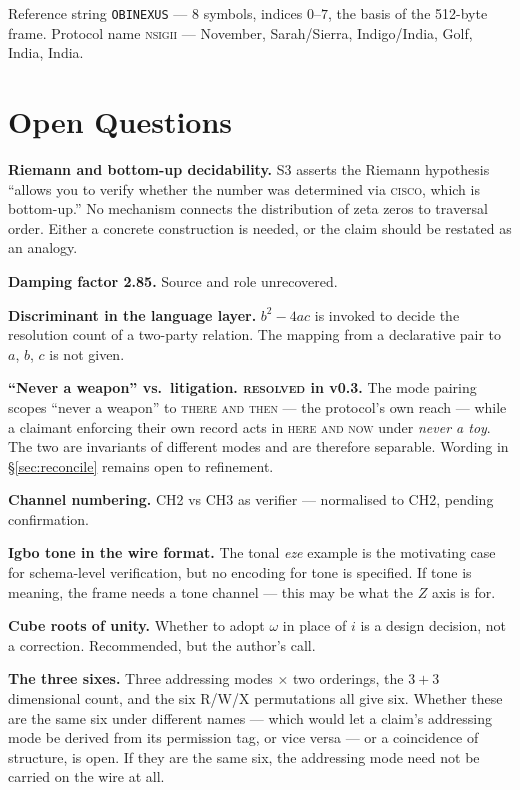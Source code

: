 \documentclass[11pt,a4paper]{article}
\newcommand{\NSIGII}{\textsc{nsigii}}
\newcommand{\CISCO}{\textsc{cisco}}
\newcommand{\OBI}{\texttt{OBINEXUS}}
\begin{document}
Reference string \OBI{} --- 8 symbols, indices $0$--$7$, the basis of the
512-byte frame. Protocol name \NSIGII{} --- November, Sarah/Sierra,
Indigo/India, Golf, India, India.

\section{Open Questions}
\label{app:open}

\begin{description}[leftmargin=1.6cm,style=nextline]
\item[C.1] \textbf{Riemann and bottom-up decidability.} S3 asserts the Riemann
  hypothesis ``allows you to verify whether the number was determined via
  \CISCO{}, which is bottom-up.'' No mechanism connects the distribution of zeta
  zeros to traversal order. Either a concrete construction is needed, or the
  claim should be restated as an analogy.
\item[C.2] \textbf{Damping factor 2.85.} Source and role unrecovered.
\item[C.3] \textbf{Discriminant in the language layer.} $b^{2}-4ac$ is invoked
  to decide the resolution count of a two-party relation. The mapping from a
  declarative pair to $a$, $b$, $c$ is not given.
\item[C.4] \textbf{``Never a weapon'' vs.\ litigation. \textsc{resolved} in
  v0.3.} The mode pairing scopes ``never a weapon'' to \textsc{there and then}
  --- the protocol's own reach --- while a claimant enforcing their own record
  acts in \textsc{here and now} under \emph{never a toy}. The two are invariants
  of different modes and are therefore separable. Wording in
  \S\ref{sec:reconcile} remains open to refinement.
\item[C.5] \textbf{Channel numbering.} CH2 vs CH3 as verifier --- normalised to
  CH2, pending confirmation.
\item[C.6] \textbf{Igbo tone in the wire format.} The tonal \emph{eze} example
  is the motivating case for schema-level verification, but no encoding for tone
  is specified. If tone is meaning, the frame needs a tone channel --- this may
  be what the $Z$ axis is for.
\item[C.7] \textbf{Cube roots of unity.} Whether to adopt $\omega$ in place of
  $i$ is a design decision, not a correction. Recommended, but the author's
  call.
\item[C.8] \textbf{The three sixes.} Three addressing modes $\times$ two
  orderings, the $3+3$ dimensional count, and the six R/W/X permutations all
  give six. Whether these are the same six under different names --- which would
  let a claim's addressing mode be derived from its permission tag, or vice
  versa --- or a coincidence of structure, is open. If they are the same six,
  the addressing mode need not be carried on the wire at all.
\end{description}
\end{document}
